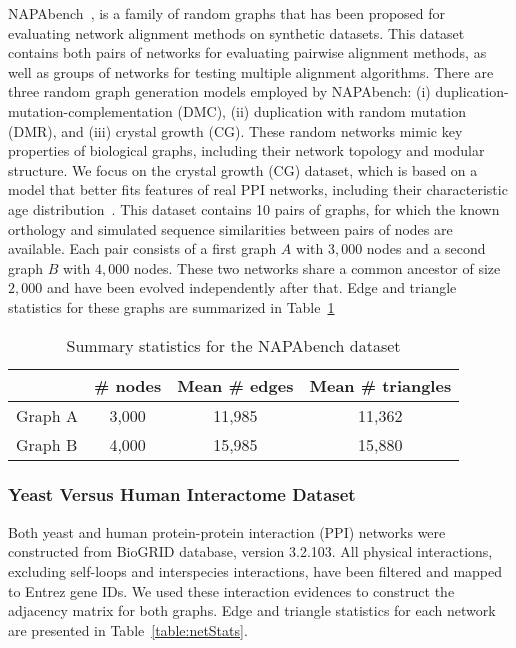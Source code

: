 \documentclass[10pt, journal, compsoc, final]{IEEEtran}
\begin{document}
NAPAbench~\cite{NAPAbench}, is a family of random graphs that has been proposed for 
evaluating network alignment methods on synthetic datasets. This dataset contains both pairs of 
networks for evaluating pairwise alignment methods, as well as groups of networks for testing 
multiple alignment algorithms. There are three random graph generation models 
employed by NAPAbench: (i) duplication-mutation-complementation (DMC), (ii) duplication with 
random mutation (DMR), and (iii) crystal growth (CG). These random 
networks mimic key properties of biological graphs, including their network topology and modular structure.
We focus on the crystal growth (CG) dataset, which is based on a model that better fits features of real PPI networks, 
including their characteristic age distribution~\cite{Kim2008}.
This dataset contains 10 pairs of graphs, for which the known orthology and simulated 
sequence similarities between pairs of nodes are available. Each pair consists of a first graph 
$A$ with $3,000$ nodes and a second graph $B$ with $4,000$ nodes. These two networks share a 
common ancestor of size $2,000$ and have been evolved independently after that.  
Edge and triangle statistics for these graphs are summarized in 
Table~\ref{table:netStats_NAPA}

\begin{table}[!t]
\caption{Summary statistics for the NAPAbench dataset}
\label{table:netStats_NAPA}
\centering
\begin{tabular}{lccc}
\toprule
&\# nodes	&Mean \# edges	&Mean \# triangles\\	\midrule
Graph A& 3,000 & 11,985	&11,362\\
Graph B& 4,000 & 15,985	&15,880 \\
\bottomrule
\end{tabular}
\end{table}

\subsubsection{Yeast Versus Human Interactome Dataset}
\label{sec:SeqSim}

Both yeast and human protein-protein 
interaction (PPI) networks were constructed from BioGRID database, version 3.2.103. All physical 
interactions, excluding self-loops and interspecies interactions, have been filtered and mapped to 
Entrez gene IDs. We used these interaction evidences to construct the adjacency matrix for both 
graphs. Edge and triangle  statistics for each network are presented in 
Table~\ref{table:netStats}.
\end{document}
